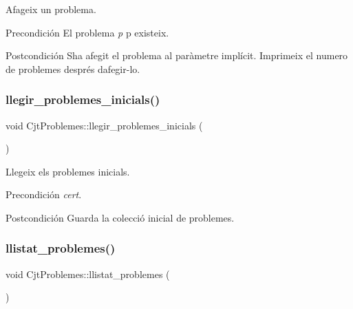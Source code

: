 Afageix un problema. 

\begin{DoxyPrecond}{Precondición}
El problema {\itshape p} p existeix. 
\end{DoxyPrecond}
\begin{DoxyPostcond}{Postcondición}
S\textquotesingle{}ha afegit el problema al paràmetre implícit. Imprimeix el numero de problemes després d\textquotesingle{}afegir-\/lo. 
\end{DoxyPostcond}
\mbox{\label{class_cjt_problemes_ac320f52e566402ed341d2f67176be14a}} 
\subsubsection{\texorpdfstring{llegir\+\_\+problemes\+\_\+inicials()}{llegir\_problemes\_inicials()}}
{\footnotesize\ttfamily void Cjt\+Problemes\+::llegir\+\_\+problemes\+\_\+inicials (\begin{DoxyParamCaption}{ }\end{DoxyParamCaption})}



Llegeix els problemes inicials. 

\begin{DoxyPrecond}{Precondición}
{\itshape cert}. 
\end{DoxyPrecond}
\begin{DoxyPostcond}{Postcondición}
Guarda la colecció inicial de problemes. 
\end{DoxyPostcond}
\mbox{\label{class_cjt_problemes_a976ab13903046970b2e128a3fa4df8fa}} 
\subsubsection{\texorpdfstring{llistat\+\_\+problemes()}{llistat\_problemes()}}
{\footnotesize\ttfamily void Cjt\+Problemes\+::llistat\+\_\+problemes (\begin{DoxyParamCaption}{ }\end{DoxyParamCaption})}



